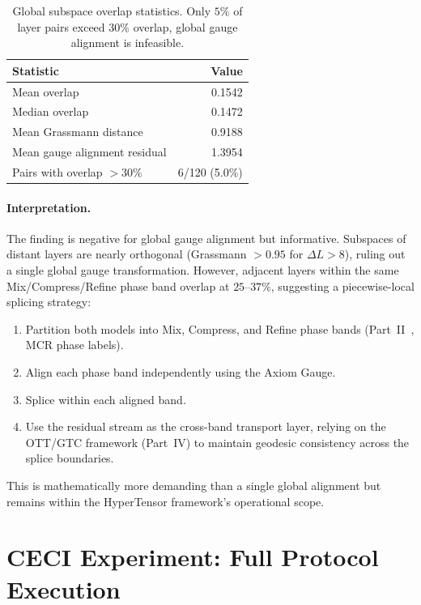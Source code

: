 \documentclass[11pt]{article}
\begin{document}
\begin{table}[h]\centering\small
\caption{Global subspace overlap statistics. Only $5\%$ of layer
pairs exceed $30\%$ overlap, global gauge alignment is infeasible.}
\label{tab:overlap-global}
\begin{tabular}{@{}lr@{}}
\toprule
Statistic & Value \\
\midrule
Mean overlap & 0.1542 \\
Median overlap & 0.1472 \\
Mean Grassmann distance & 0.9188 \\
Mean gauge alignment residual & 1.3954 \\
Pairs with overlap $>30\%$ & 6/120 (5.0\%) \\
\bottomrule
\end{tabular}
\end{table}

\paragraph{Interpretation.} The finding is negative for global gauge
alignment but informative. Subspaces of distant layers are nearly
orthogonal (Grassmann $>0.95$ for $\Delta L > 8$), ruling out a single
global gauge transformation. However, adjacent layers within the same
Mix/Compress/Refine phase band overlap at $25$--$37\%$, suggesting a
piecewise-local splicing strategy:

\begin{enumerate}
\item Partition both models into Mix, Compress, and Refine phase bands
 (Part~II~\cite{stewart2026gp}, MCR phase labels).
\item Align each phase band independently using the Axiom Gauge.
\item Splice within each aligned band.
\item Use the residual stream as the cross-band transport layer,
 relying on the OTT/GTC framework (Part~IV) to maintain geodesic
 consistency across the splice boundaries.
\end{enumerate}

This is mathematically more demanding than a single global alignment
but remains within the HyperTensor framework's operational scope.

\section{CECI Experiment: Full Protocol Execution}
\label{sec:experiment}
\end{document}

